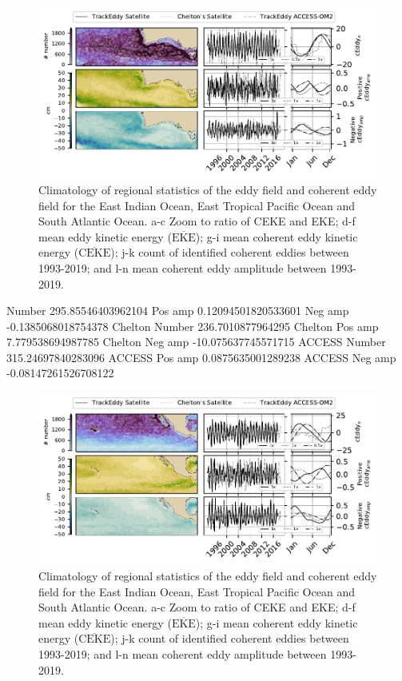 \documentclass[draft,linenumbers]{agujournal2019}
\newcommand{\MEKE}{\overline{\textrm{EKE}}}
\newcommand{\MCEKE}{\overline{\textrm{CEKE}}}
\begin{document}
	\begin{figure}
	    \centering
	    \includegraphics[width=1\textwidth]{figures/regional_eke_ceke_stats_0.pdf}
	    \caption{Climatology of regional statistics of the eddy field and coherent eddy field for the East Indian Ocean, East Tropical Pacific Ocean and South Atlantic Ocean. a-c Zoom to ratio of CEKE and EKE; d-f  mean eddy kinetic energy ($\MEKE$); g-i mean coherent eddy kinetic energy ($\MCEKE$); j-k count of identified coherent eddies between 1993-2019; and l-n mean coherent eddy amplitude between 1993-2019.}
	    \label{fig:east_indian_cycle}
	\end{figure}

	Number 295.85546403962104
	Pos amp 0.12094501820533601
	Neg amp -0.1385068018754378
	Chelton Number 236.7010877964295
	Chelton Pos amp 7.779538694987785
	Chelton Neg amp -10.075637745571715
	ACCESS Number 315.24697840283096
	ACCESS Pos amp 0.0875635001289238
	ACCESS Neg amp -0.08147261526708122

	\begin{figure}
	    \centering
	    \includegraphics[width=1\textwidth]{figures/regional_eke_ceke_stats_1.pdf}
	    \caption{Climatology of regional statistics of the eddy field and coherent eddy field for the East Indian Ocean, East Tropical Pacific Ocean and South Atlantic Ocean. a-c Zoom to ratio of CEKE and EKE; d-f  mean eddy kinetic energy ($\MEKE$); g-i mean coherent eddy kinetic energy ($\MCEKE$); j-k count of identified coherent eddies between 1993-2019; and l-n mean coherent eddy amplitude between 1993-2019.}
	    \label{fig:east_tropical_cycle}
	\end{figure}
\end{document}
